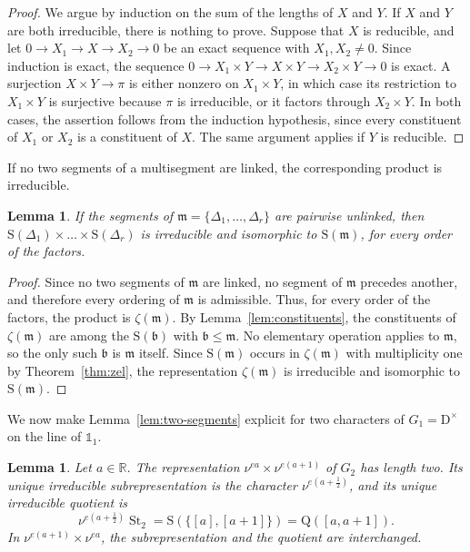 \documentclass[11pt]{amsart}
\numberwithin{equation}{section}
\theoremstyle{plain}
\newtheorem{lemma}[theorem]{Lemma}
\theoremstyle{definition}
\theoremstyle{remark}
\newcommand{\R}{\mathbb{R}}
\newcommand{\one}{\mathds{1}}
\DeclareMathOperator{\St}{St}
\newcommand{\mm}{\mathfrak{m}}
\newcommand{\bb}{\mathfrak{b}}
\newcommand{\Ss}{\mathrm{S}}
\newcommand{\Qq}{\mathrm{Q}}
\begin{document}
\begin{proof}
	We argue by induction on the sum of the lengths of $X$ and $Y$. If $X$ and $Y$ are both irreducible, there is nothing to prove. Suppose that $X$ is reducible, and let $0\to X_1\to X\to X_2\to0$ be an exact sequence with $X_1,X_2\ne0$. Since induction is exact, the sequence $0\to X_1\times Y\to X\times Y\to X_2\times Y\to0$ is exact. A surjection $X\times Y\to\pi$ is either nonzero on $X_1\times Y$, in which case its restriction to $X_1\times Y$ is surjective because $\pi$ is irreducible, or it factors through $X_2\times Y$. In both cases, the assertion follows from the induction hypothesis, since every constituent of $X_1$ or $X_2$ is a constituent of $X$. The same argument applies if $Y$ is reducible.
\end{proof}

If no two segments of a multisegment are linked, the corresponding product is irreducible.

\begin{lemma}\label{lem:unlinked-product}
	If the segments of $\mm=\{\Delta_1,\dots,\Delta_r\}$ are pairwise unlinked, then $\Ss(\Delta_1)\times\dots\times\Ss(\Delta_r)$ is irreducible and isomorphic to $\Ss(\mm)$, for every order of the factors.
\end{lemma}

\begin{proof}
	Since no two segments of $\mm$ are linked, no segment of $\mm$ precedes another, and therefore every ordering of $\mm$ is admissible. Thus, for every order of the factors, the product is $\zeta(\mm)$. By Lemma~\ref{lem:constituents}, the constituents of $\zeta(\mm)$ are among the $\Ss(\bb)$ with $\bb\le\mm$. No elementary operation applies to $\mm$, so the only such $\bb$ is $\mm$ itself. Since $\Ss(\mm)$ occurs in $\zeta(\mm)$ with multiplicity one by Theorem~\ref{thm:zel}, the representation $\zeta(\mm)$ is irreducible and isomorphic to $\Ss(\mm)$.
\end{proof}

We now make Lemma~\ref{lem:two-segments} explicit for two characters of $G_1=\mathrm{D}^\times$ on the line of $\one_1$.

\begin{lemma}\label{lem:St2}
	Let $a\in\R$. The representation $\nu^{ea}\times\nu^{e(a+1)}$ of $G_2$ has length two. Its unique irreducible subrepresentation is the character $\nu^{e(a+\frac12)}$, and its unique irreducible quotient is
	$$
	\nu^{e(a+\frac12)}\St_2=\Ss(\{[a],[a+1]\})=\Qq([a,a+1]).
	$$
	In $\nu^{e(a+1)}\times\nu^{ea}$, the subrepresentation and the quotient are interchanged.
\end{lemma}
\end{document}
